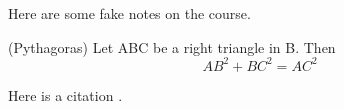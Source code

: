 \documentclass[12pt]{report}
\begin{document}
  \maketitle

  Here are some fake notes on the course.
  \begin{theorem}(Pythagoras) Let ABC be a right triangle in B. Then
    $$AB^2+BC^2 = AC^2$$
  \end{theorem}
  Here is a citation \cite{PaIn09}.

  
\end{document}
